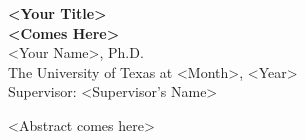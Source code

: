 \vspace*{2em}
\begin{center}
    {\large\textbf{<Your Title>}}\\[0.2em]
    {\large\textbf{<Comes Here>}}
    \\[2.5em]
    <Your Name>, Ph.D.\\
    The University of Texas at <Month>, <Year>\\[2.5em]
    Supervisor: <Supervisor's Name>
\end{center}
\vspace{2.5em}

<Abstract comes here>

\clearpage